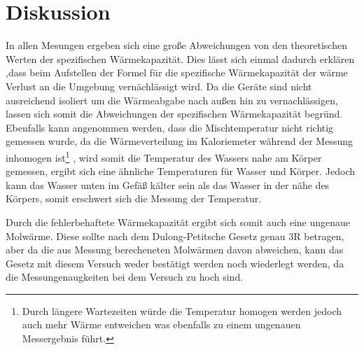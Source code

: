 \newpage
\section{Diskussion}
\label{sec:Diskussion}
In allen Mesungen ergeben sich eine große Abweichungen von den theoretischen Werten der spezifischen Wärmekapazität.
Dies lässt sich einmal dadurch erklären ,dass beim Aufstellen der Formel für die spezifische Wärmekapazität der wärme Verlust an die Umgebung vernächlässigt wird.
Da die Geräte sind nicht ausreichend isoliert um die Wärmeabgabe nach außen hin zu vernachlässigen, lassen sich somit die
Abweichungen der spezifischen Wärmekapazität begründ.
Ebenfalls kann angenommen werden, dass die Mischtemperatur nicht richtig gemessen wurde, da
die Wärmeverteilung im Kaloriemeter während der Messung inhomogen ist\footnote{Durch längere Wartezeiten würde die Temperatur homogen werden jedoch
auch mehr Wärme entweichen was ebenfalls zu einem ungenauen Messergebnis führt.} , wird somit die Temperatur des Wassers nahe am
Körper gemessen, ergibt sich eine ähnliche Temperaturen für Wasser und Körper.
Jedoch kann das Wasser unten im Gefäß kälter sein als das Wasser in der nähe des Körpers, somit erschwert sich die Messung der Temperatur.

Durch die fehlerbehaftete Wärmekapazität ergibt sich somit auch eine ungenaue Molwärme.
Diese sollte nach dem Dulong-Petitsche Gesetz genau 3R betragen, aber da die aus Messung
berecheneten Molwärmen davon abweichen, kann das Gesetz mit diesem Versuch weder
bestätigt werden noch  wiederlegt werden, da die Messungenaugkeiten bei dem Versuch zu hoch sind.
